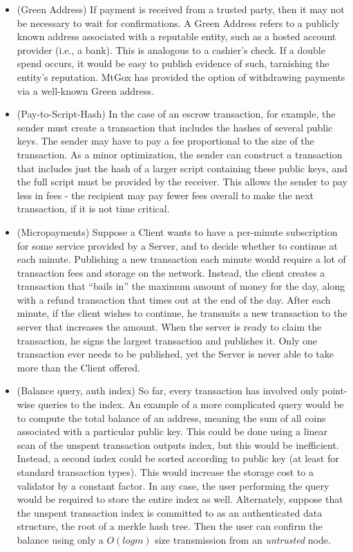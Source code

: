 \begin{itemize}
\item (Green Address) If payment is received from a trusted party, then it may not be necessary to wait for confirmations. A Green Address refers to a publicly known address associated with a reputable entity, such as a hosted account provider (i.e., a bank). This is analogous to a cashier's check. If a double spend occurs, it would be easy to publish evidence of such, tarnishing the entity's reputation. MtGox has provided the option of withdrawing payments via a well-known Green address.
\item (Pay-to-Script-Hash) In the case of an escrow transaction, for example, the sender must create a transaction that includes the hashes of several public keys. The sender may have to pay a fee proportional to the size of the transaction. As a minor optimization, the sender can construct a transaction that includes just the hash of a larger script containing these public keys, and the full script must be provided by the receiver. This allows the sender to pay less in fees - the recipient may pay fewer fees overall to make the next transaction, if it is not time critical.
\item (Micropayments) Suppose a Client wants to have a per-minute subscription for some service provided by a Server, and to decide whether to continue at each minute. Publishing a new transaction each minute would require a lot of transaction fees and storage on the network. Instead, the client creates a transaction that ``bails in'' the maximum amount of money for the day, along with a refund transaction that times out at the end of the day. After each minute, if the client wishes to continue, he transmits a new transaction to the server that increases the amount. When the server is ready to claim the transaction, he signs the largest transaction and publishes it. Only one transaction ever needs to be published, yet the Server is never able to take more than the Client offered.
\item (Balance query, auth index) So far, every transaction has involved only point-wise queries to the index. An example of a more complicated query would be to compute the total balance of an address, meaning the sum of all coins associated with a particular public key. This could be done using a linear scan of the unspent transaction outputs index, but this would be inefficient. Instead, a second index could be sorted according to public key (at least for standard transaction types). This would increase the storage cost to a validator by a constant factor. In any case, the user performing the query would be required to store the entire index as well. Alternately, suppose that the unspent transaction index is committed to as an authenticated data structure, the root of a merkle hash tree. Then the user can confirm the balance using only a $O(log m)$ size transmission from an {\em untrusted} node.
\end{itemize}

